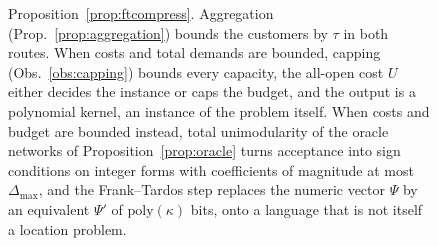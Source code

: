 \begin{figure}[H]
{  Proposition~\ref{prop:ftcompress}. Aggregation
  (Prop.~\ref{prop:aggregation}) bounds the customers by $\tau$ in both
  routes. When costs and total demands are bounded, capping
  (Obs.~\ref{obs:capping}) bounds every capacity, the all-open cost $U$
  either decides the instance or caps the budget, and the output is a
  polynomial kernel, an instance of the problem itself. When costs and
  budget are bounded instead, total
  unimodularity of the oracle networks of
  Proposition~\ref{prop:oracle} turns acceptance into sign conditions
  on integer forms with coefficients of magnitude at most
  $\Delta_{\max}$, and the Frank--Tardos step replaces the numeric
  vector $\Psi$ by an equivalent $\Psi'$ of $\mathrm{poly}(\kappa)$
  bits, onto a language that is not itself a location problem.}
  \label{fig:ftpipeline}
\end{figure}

